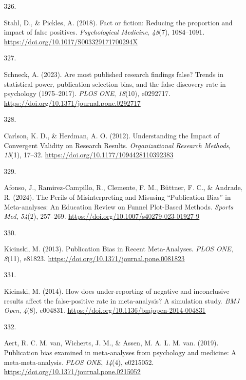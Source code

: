 \documentclass[
  11pt,
  letterpaper,
]{scrreprt}
\newlength{\cslhangindent}
\newlength{\csllabelwidth}
\newenvironment{CSLReferences}[2] %
 {\begin{list}{}{%
  \setlength{\itemindent}{0pt}
  \setlength{\leftmargin}{0pt}
  \setlength{\parsep}{0pt}
  \ifodd #1
   \setlength{\leftmargin}{\cslhangindent}
   \setlength{\itemindent}{-1\cslhangindent}
  \fi
  \setlength{\itemsep}{#2\baselineskip}}}
 {\end{list}}
\newcommand{\CSLLeftMargin}[1]{\parbox[t]{\csllabelwidth}{\strut#1\strut}}
\newcommand{\CSLRightInline}[1]{\parbox[t]{\linewidth - \csllabelwidth}{\strut#1\strut}}
\begin{document}
\begin{CSLReferences}{0}{0}
\CSLLeftMargin{326. }%
\CSLRightInline{Stahl, D., \& Pickles, A. (2018). Fact or fiction:
Reducing the proportion and impact of false positives.
\emph{Psychological Medicine}, \emph{48}(7), 1084--1091.
\url{https://doi.org/10.1017/S003329171700294X}}

\CSLLeftMargin{327. }%
\CSLRightInline{Schneck, A. (2023). Are most published research findings
false? {Trends} in statistical power, publication selection bias, and
the false discovery rate in psychology (1975--2017). \emph{PLOS ONE},
\emph{18}(10), e0292717.
\url{https://doi.org/10.1371/journal.pone.0292717}}

\CSLLeftMargin{328. }%
\CSLRightInline{Carlson, K. D., \& Herdman, A. O. (2012). Understanding
the {Impact} of {Convergent Validity} on {Research Results}.
\emph{Organizational Research Methods}, \emph{15}(1), 17--32.
\url{https://doi.org/10.1177/1094428110392383}}

\CSLLeftMargin{329. }%
\CSLRightInline{Afonso, J., Ramirez-Campillo, R., Clemente, F. M.,
Büttner, F. C., \& Andrade, R. (2024). The {Perils} of {Misinterpreting}
and {Misusing} {``{Publication Bias}''} in {Meta-analyses}: {An
Education Review} on {Funnel Plot-Based Methods}. \emph{Sports Med},
\emph{54}(2), 257--269.
\url{https://doi.org/10.1007/s40279-023-01927-9}}

\CSLLeftMargin{330. }%
\CSLRightInline{Kicinski, M. (2013). Publication {Bias} in {Recent
Meta-Analyses}. \emph{PLOS ONE}, \emph{8}(11), e81823.
\url{https://doi.org/10.1371/journal.pone.0081823}}

\CSLLeftMargin{331. }%
\CSLRightInline{Kicinski, M. (2014). How does under-reporting of
negative and inconclusive results affect the false-positive rate in
meta-analysis? {A} simulation study. \emph{BMJ Open}, \emph{4}(8),
e004831. \url{https://doi.org/10.1136/bmjopen-2014-004831}}

\CSLLeftMargin{332. }%
\CSLRightInline{Aert, R. C. M. van, Wicherts, J. M., \& Assen, M. A. L.
M. van. (2019). Publication bias examined in meta-analyses from
psychology and medicine: {A} meta-meta-analysis. \emph{PLOS ONE},
\emph{14}(4), e0215052.
\url{https://doi.org/10.1371/journal.pone.0215052}}


\end{CSLReferences}
\end{document}
